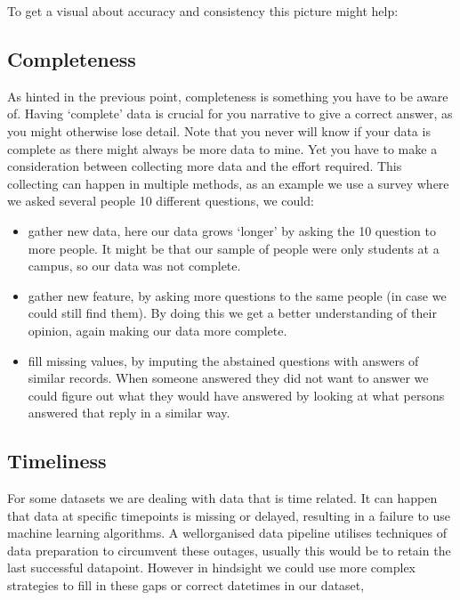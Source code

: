 \documentclass[letterpaper,10pt,english]{jupyterBook}
\begin{document}
\sphinxAtStartPar
To get a visual  about accuracy and consistency this picture might help:

\sphinxAtStartPar
{}


\subsection{Completeness}
\label{\detokenize{c2_data_preparation/introduction:completeness}}
\sphinxAtStartPar
As hinted in the previous point, completeness is something you have to be aware of.
Having ‘complete’ data is crucial for you narrative to give a correct answer, as you might otherwise lose detail.
Note that you never will know if your data is complete as there might always be more data to mine.
Yet you have to make a consideration between collecting more data and the effort required.
This collecting can happen in multiple methods, as an example we use a survey where we asked several people 10 different questions, we could:
\begin{itemize}
\item {} 
\sphinxAtStartPar
gather new data, here our data grows ‘longer’ by asking the 10 question to more people.
It might be that our sample of people were only students at a campus, so our data was not complete.

\item {} 
\sphinxAtStartPar
gather new feature, by asking more questions to the same people (in case we could still find them).
By doing this we get a better understanding of their opinion, again making our data more complete.

\item {} 
\sphinxAtStartPar
fill missing values, by imputing the abstained questions with answers of similar records.
When someone answered they did not want to answer we could figure out what they would have answered by looking at what persons answered that reply in a similar way.

\end{itemize}


\subsection{Timeliness}
\label{\detokenize{c2_data_preparation/introduction:timeliness}}
\sphinxAtStartPar
For some datasets we are dealing with data that is time related.
It can happen that data at specific timepoints is missing or delayed, resulting in a failure to use machine learning algorithms.
A well\sphinxhyphen{}organised data pipeline utilises techniques of data preparation to circumvent these outages, usually this would be to retain the last successful datapoint.
However in hindsight we could use more complex strategies to fill in these gaps or correct datetimes in our dataset,
\end{document}
